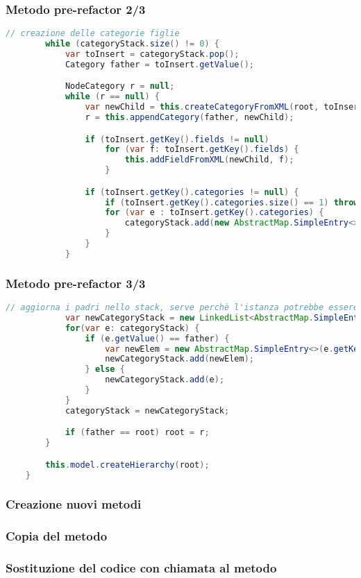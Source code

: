 \begin{frame}[fragile]
    \frametitle{Metodo pre-refactor 2/3}

    \lstset{style=tiny_java}
    \begin{lstlisting}[language=java, caption={Snippet tratto da v5, Controller.java}, firstnumber=23]
        // creazione delle categorie figlie
        while (categoryStack.size() != 0) {
            var toInsert = categoryStack.pop();
            Category father = toInsert.getValue();

            NodeCategory r = null;
            while (r == null) {
                var newChild = this.createCategoryFromXML(root, toInsert.getKey());
                r = this.appendCategory(father, newChild);

                if (toInsert.getKey().fields != null)
                    for (var f: toInsert.getKey().fields) {
                        this.addFieldFromXML(newChild, f);
                    }

                if (toInsert.getKey().categories != null) {
                    if (toInsert.getKey().categories.size() == 1) throw new InvalidCategoryException();
                    for (var e : toInsert.getKey().categories) {
                        categoryStack.add(new AbstractMap.SimpleEntry<>(e, newChild));
                    }
                }
            }
    \end{lstlisting}
\end{frame}

\begin{frame}[fragile]
    \frametitle{Metodo pre-refactor 3/3}

    \lstset{style=tiny_java}
    \begin{lstlisting}[language=java, caption={Snippet tratto da v5, Controller.java}, firstnumber=46]
            // aggiorna i padri nello stack, serve perchè l'istanza potrebbe essere cambiata
            var newCategoryStack = new LinkedList<AbstractMap.SimpleEntry<XMLImport.CategoryXML, Category>>();
            for(var e: categoryStack) {
                if (e.getValue() == father) {
                    var newElem = new AbstractMap.SimpleEntry<>(e.getKey(), (Category) r);
                    newCategoryStack.add(newElem);
                } else {
                    newCategoryStack.add(e);
                }
            }
            categoryStack = newCategoryStack;

            if (father == root) root = r;
        }

        this.model.createHierarchy(root);
    }
    \end{lstlisting}
\end{frame}

\begin{frame}
    \frametitle{Creazione nuovi metodi}
\end{frame}

\begin{frame}
    \frametitle{Copia del metodo}
\end{frame}

\begin{frame}
    \frametitle{Sostituzione del codice con chiamata al metodo}
\end{frame}